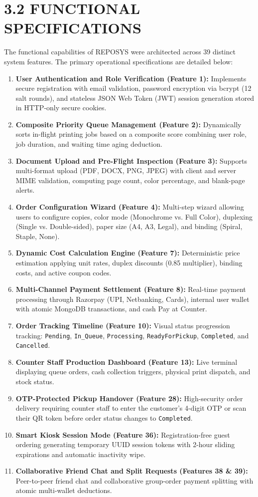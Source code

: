 \documentclass[12pt,a4paper,oneside]{report}
\begin{document}
\section{3.2 FUNCTIONAL SPECIFICATIONS}
The functional capabilities of REPOSYS were architected across 39 distinct system features. The primary operational specifications are detailed below:
\begin{enumerate}[leftmargin=0.35in, itemsep=2pt]
  \item \textbf{User Authentication and Role Verification (Feature 1):} Implements secure registration with email validation, password encryption via bcrypt (12 salt rounds), and stateless JSON Web Token (JWT) session generation stored in HTTP-only secure cookies.
  \item \textbf{Composite Priority Queue Management (Feature 2):} Dynamically sorts in-flight printing jobs based on a composite score combining user role, job duration, and waiting time aging deduction.
  \item \textbf{Document Upload and Pre-Flight Inspection (Feature 3):} Supports multi-format upload (PDF, DOCX, PNG, JPEG) with client and server MIME validation, computing page count, color percentage, and blank-page alerts.
  \item \textbf{Order Configuration Wizard (Feature 4):} Multi-step wizard allowing users to configure copies, color mode (Monochrome vs. Full Color), duplexing (Single vs. Double-sided), paper size (A4, A3, Legal), and binding (Spiral, Staple, None).
  \item \textbf{Dynamic Cost Calculation Engine (Feature 7):} Deterministic price estimation applying unit rates, duplex discounts (0.85 multiplier), binding costs, and active coupon codes.
  \item \textbf{Multi-Channel Payment Settlement (Feature 8):} Real-time payment processing through Razorpay (UPI, Netbanking, Cards), internal user wallet with atomic MongoDB transactions, and cash Pay at Counter.
  \item \textbf{Order Tracking Timeline (Feature 10):} Visual status progression tracking: \texttt{Pending}, \texttt{In\_Queue}, \texttt{Processing}, \texttt{ReadyForPickup}, \texttt{Completed}, and \texttt{Cancelled}.
  \item \textbf{Counter Staff Production Dashboard (Feature 13):} Live terminal displaying queue orders, cash collection triggers, physical print dispatch, and stock status.
  \item \textbf{OTP-Protected Pickup Handover (Feature 28):} High-security order delivery requiring counter staff to enter the customer's 4-digit OTP or scan their QR token before order status changes to \texttt{Completed}.
  \item \textbf{Smart Kiosk Session Mode (Feature 36):} Registration-free guest ordering generating temporary UUID session tokens with 2-hour sliding expirations and automatic inactivity wipe.
  \item \textbf{Collaborative Friend Chat and Split Requests (Features 38 \& 39):} Peer-to-peer friend chat and collaborative group-order payment splitting with atomic multi-wallet deductions.
\end{enumerate}
\end{document}
